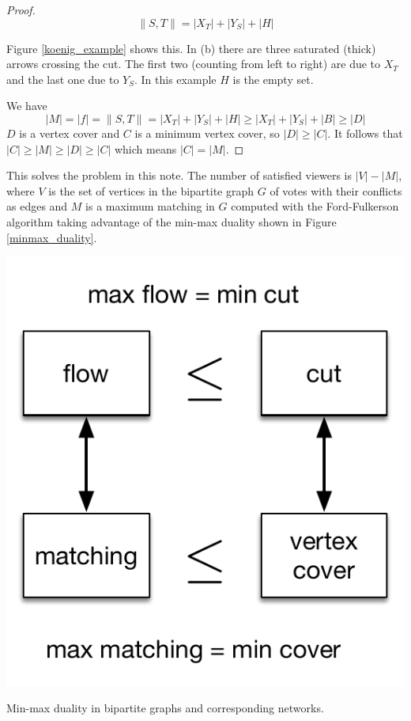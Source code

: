 \begin{proof}
$$
\|S, T\| = |X_T| + |Y_S| + |H|
$$

\noindent Figure \ref{koenig_example} shows this. In (b) there are three saturated (thick) arrows crossing the cut. The first two (counting from left to right) are due to $X_T$ and the last one due to $Y_S$. In this example $H$ is the empty set.

We have
$$
|M| = |f| = \|S, T\| = |X_T| + |Y_S| + |H| \geq |X_T| + |Y_S| + |B| \geq |D|
$$
\noindent $D$ is a vertex cover and $C$ is a minimum vertex cover, so $|D| \geq |C|$. It follows that $|C| \geq |M| \geq |D| \geq |C|$ which means $|C| = |M|$.
\end{proof}

This solves the problem in this note. The number of satisfied viewers is $|V| - |M|$, where $V$ is the set of vertices in the bipartite graph $G$ of votes with their conflicts as edges and $M$ is a maximum matching in $G$ computed with the Ford-Fulkerson algorithm taking advantage of the min-max duality shown in Figure \ref{minmax_duality}.

\begin{marginfigure}
    \includegraphics[scale=0.5]{flowcutminmax.pdf}
    \caption{Min-max duality in bipartite graphs and corresponding networks.}
	\label{minmax_duality}
\end{marginfigure}{}

